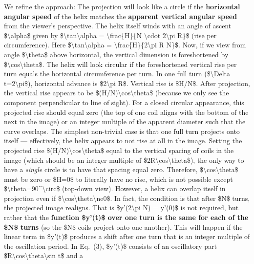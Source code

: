 \documentclass[]{article}
\begin{document}
We refine the approach: The projection will look like a circle if the
\textbf{horizontal angular speed} of the helix matches the
\textbf{apparent vertical angular speed} from the viewer's perspective.
The helix itself winds with an angle of ascent \$\textbackslash{}alpha\$
given by \$\textbackslash{}tan\textbackslash{}alpha =
\textbackslash{}frac\{H\}\{N \textbackslash{}cdot 2\textbackslash{}pi
R\}\$ (rise per circumference). Here
\$\textbackslash{}tan\textbackslash{}alpha =
\textbackslash{}frac\{H\}\{2\textbackslash{}pi R N\}\$. Now, if we view
from angle \$\textbackslash{}theta\$ above horizontal, the vertical
dimension is foreshortened by
\$\textbackslash{}cos\textbackslash{}theta\$. The helix will look
circular if the foreshortened vertical rise per turn equals the
horizontal circumference per turn. In one full turn
(\$\textbackslash{}Delta t=2\textbackslash{}pi\$), horizontal advance is
\$2\textbackslash{}pi R\$. Vertical rise is \$H/N\$. After projection,
the vertical rise appears to be
\$(H/N)\textbackslash{}cos\textbackslash{}theta\$ (because we only see
the component perpendicular to line of sight). For a closed circular
appearance, this projected rise should equal zero (the top of one coil
aligns with the bottom of the next in the image) or an integer multiple
of the apparent diameter such that the curve overlaps. The simplest
non-trivial case is that one full turn projects onto itself ---
effectively, the helix appears to not rise at all in the image. Setting
the projected rise \$(H/N)\textbackslash{}cos\textbackslash{}theta\$
equal to the vertical spacing of coils in the image (which should be an
integer multiple of \$2R\textbackslash{}cos\textbackslash{}theta\$), the
only way to have a \emph{single} circle is to have that spacing equal
zero. Therefore,
\$\textbackslash{}cos\textbackslash{}theta\$ must be zero or \$H=0\$ to
literally have no rise, which is not possible except
\$\textbackslash{}theta=90\^{}\textbackslash{}circ\$ (top-down view).
However, a helix can overlap itself in projection even if
\$\textbackslash{}cos\textbackslash{}theta\textbackslash{}ne0\$. In
fact, the condition is that after \$N\$ turns, the projected image
realigns. That is \$y'(2\textbackslash{}pi N) = y'(0)\$ is not required,
but rather that the \textbf{function \$y'(t)\$ over one turn is the same
for each of the \$N\$ turns} (so the \$N\$ coils project onto one
another). This will happen if the linear term in \$y'(t)\$ produces a
shift after one turn that is an integer multiple of the oscillation
period. In Eq.~(3), \$y'(t)\$ consists of an oscillatory part
\$R\textbackslash{}cos\textbackslash{}theta\textbackslash{}sin t\$ and a
\end{document}
